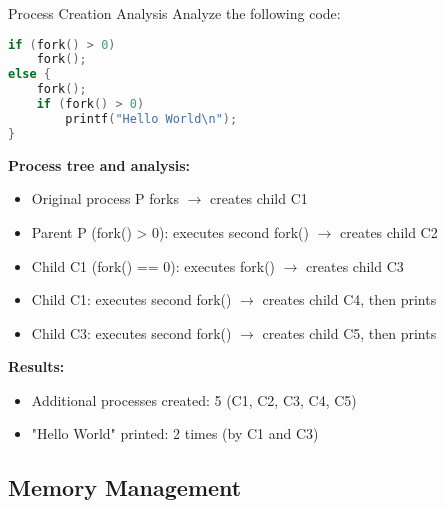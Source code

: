 \begin{example2}{Process Creation Analysis}
    Analyze the following code:
    
\begin{lstlisting}[language=C, style=basesmol]
if (fork() > 0)
    fork();
else {
    fork();
    if (fork() > 0)
        printf("Hello World\n");
}
\end{lstlisting}

    \tcblower
    
    \textbf{Process tree and analysis:}
    \begin{itemize}
        \item Original process P forks $\rightarrow$ creates child C1
        \item Parent P (fork() > 0): executes second fork() $\rightarrow$ creates child C2
        \item Child C1 (fork() == 0): executes fork() $\rightarrow$ creates child C3
        \item Child C1: executes second fork() $\rightarrow$ creates child C4, then prints
        \item Child C3: executes second fork() $\rightarrow$ creates child C5, then prints
    \end{itemize}
    
    \textbf{Results:}
    \begin{itemize}
        \item Additional processes created: 5 (C1, C2, C3, C4, C5)
        \item "Hello World" printed: 2 times (by C1 and C3)
    \end{itemize}
\end{example2}

\subsection{Memory Management}

